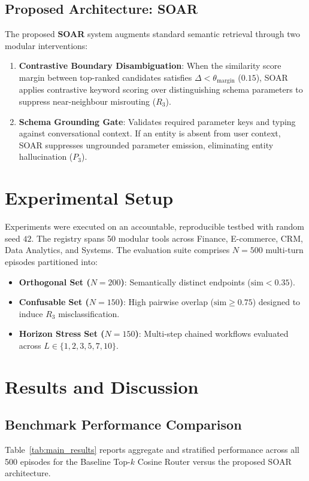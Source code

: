 \documentclass[10pt,journal,compsoc]{IEEEtran}
\begin{document}
\subsection{Proposed Architecture: SOAR}
The proposed \textbf{SOAR} system augments standard semantic retrieval through two modular interventions:
\begin{enumerate}
    \item \textbf{Contrastive Boundary Disambiguation}: When the similarity score margin between top-ranked candidates satisfies $\Delta < \theta_{\text{margin}}$ ($0.15$), SOAR applies contrastive keyword scoring over distinguishing schema parameters to suppress near-neighbour misrouting ($R_3$).
    \item \textbf{Schema Grounding Gate}: Validates required parameter keys and typing against conversational context. If an entity is absent from user context, SOAR suppresses ungrounded parameter emission, eliminating entity hallucination ($P_3$).
\end{enumerate}

\section{Experimental Setup}
Experiments were executed on an accountable, reproducible testbed with random seed $42$. The registry spans 50 modular tools across Finance, E-commerce, CRM, Data Analytics, and Systems. The evaluation suite comprises $N = 500$ multi-turn episodes partitioned into:
\begin{itemize}
    \item \textbf{Orthogonal Set ($N = 200$)}: Semantically distinct endpoints ($\text{sim} < 0.35$).
    \item \textbf{Confusable Set ($N = 150$)}: High pairwise overlap ($\text{sim} \ge 0.75$) designed to induce $R_3$ misclassification.
    \item \textbf{Horizon Stress Set ($N = 150$)}: Multi-step chained workflows evaluated across $L \in \{1, 2, 3, 5, 7, 10\}$.
\end{itemize}

\section{Results and Discussion}

\subsection{Benchmark Performance Comparison}
Table~\ref{tab:main_results} reports aggregate and stratified performance across all 500 episodes for the Baseline Top-$k$ Cosine Router versus the proposed SOAR architecture.
\end{document}
